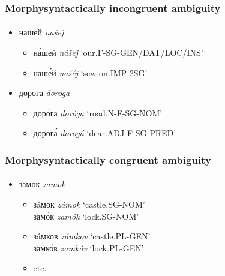 \documentclass{beamer}
\newcommand{\rus}[1]{\foreignlanguage{russian}{#1}}
\begin{document}
\begin{frame}
\frametitle{Morphysyntactically incongruent ambiguity}
\framesubtitle{}
\begin{itemize}
	\item \rus{нашей} \emph{našej}
	\begin{itemize}
		\item \rus{н\'{а}шей} \emph{nášej} `our.F-SG-GEN/DAT/LOC/INS'
		\item \rus{наш\'{е}й} \emph{našéj} `sew on.IMP-2SG'
	\end{itemize}
	\pause
	\item \rus{дорога} \emph{doroga}
	\begin{itemize}
		\item \rus{дор\'{о}га} \emph{doróga} `road.N-F-SG-NOM'
    	\item \rus{дорог\'{а}} \emph{dorogá} `dear.ADJ-F-SG-PRED'
	\end{itemize}
\end{itemize}
\end{frame}

\begin{frame}
\frametitle{Morphysyntactically congruent ambiguity}
\framesubtitle{}
\begin{itemize}
	\item \rus{замок} \emph{zamok}
	\begin{itemize}
		\item \rus{з\'{a}мок} \emph{z\'{a}mok} `castle.SG-NOM'\\
			  \rus{зам\'{о}к} \emph{zam\'{o}k} `lock.SG-NOM'
		\item \rus{з\'{a}мков} \emph{z\'{a}mkov} `castle.PL-GEN'\\
			  \rus{замк\'{о}в} \emph{zamk\'{o}v} `lock.PL-GEN'
		\item etc.
	\end{itemize}
\end{itemize}
\end{frame}
\end{document}
